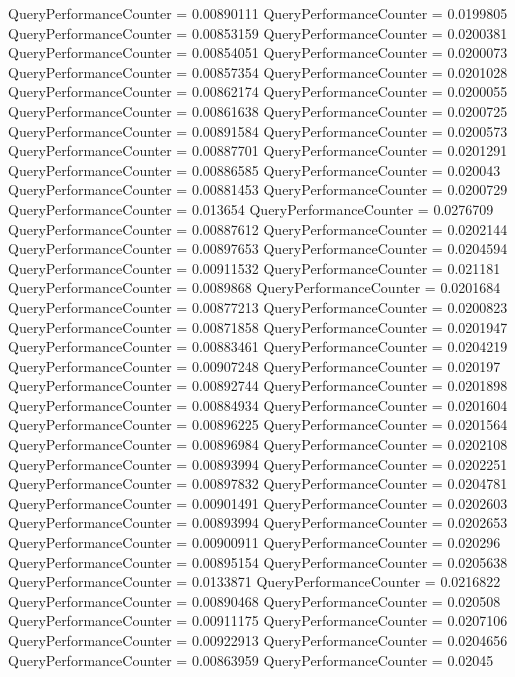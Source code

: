 \documentclass[9pt]{article}
\theoremstyle{plain}
\theoremstyle{definition}
\theoremstyle{remark}
\numberwithin{equation}{section}
\begin{document}
QueryPerformanceCounter  =  0.00890111
QueryPerformanceCounter  =  0.0199805
QueryPerformanceCounter  =  0.00853159
QueryPerformanceCounter  =  0.0200381
QueryPerformanceCounter  =  0.00854051
QueryPerformanceCounter  =  0.0200073
QueryPerformanceCounter  =  0.00857354
QueryPerformanceCounter  =  0.0201028
QueryPerformanceCounter  =  0.00862174
QueryPerformanceCounter  =  0.0200055
QueryPerformanceCounter  =  0.00861638
QueryPerformanceCounter  =  0.0200725
QueryPerformanceCounter  =  0.00891584
QueryPerformanceCounter  =  0.0200573
QueryPerformanceCounter  =  0.00887701
QueryPerformanceCounter  =  0.0201291
QueryPerformanceCounter  =  0.00886585
QueryPerformanceCounter  =  0.020043
QueryPerformanceCounter  =  0.00881453
QueryPerformanceCounter  =  0.0200729
QueryPerformanceCounter  =  0.013654
QueryPerformanceCounter  =  0.0276709
QueryPerformanceCounter  =  0.00887612
QueryPerformanceCounter  =  0.0202144
QueryPerformanceCounter  =  0.00897653
QueryPerformanceCounter  =  0.0204594
QueryPerformanceCounter  =  0.00911532
QueryPerformanceCounter  =  0.021181
QueryPerformanceCounter  =  0.0089868
QueryPerformanceCounter  =  0.0201684
QueryPerformanceCounter  =  0.00877213
QueryPerformanceCounter  =  0.0200823
QueryPerformanceCounter  =  0.00871858
QueryPerformanceCounter  =  0.0201947
QueryPerformanceCounter  =  0.00883461
QueryPerformanceCounter  =  0.0204219
QueryPerformanceCounter  =  0.00907248
QueryPerformanceCounter  =  0.020197
QueryPerformanceCounter  =  0.00892744
QueryPerformanceCounter  =  0.0201898
QueryPerformanceCounter  =  0.00884934
QueryPerformanceCounter  =  0.0201604
QueryPerformanceCounter  =  0.00896225
QueryPerformanceCounter  =  0.0201564
QueryPerformanceCounter  =  0.00896984
QueryPerformanceCounter  =  0.0202108
QueryPerformanceCounter  =  0.00893994
QueryPerformanceCounter  =  0.0202251
QueryPerformanceCounter  =  0.00897832
QueryPerformanceCounter  =  0.0204781
QueryPerformanceCounter  =  0.00901491
QueryPerformanceCounter  =  0.0202603
QueryPerformanceCounter  =  0.00893994
QueryPerformanceCounter  =  0.0202653
QueryPerformanceCounter  =  0.00900911
QueryPerformanceCounter  =  0.020296
QueryPerformanceCounter  =  0.00895154
QueryPerformanceCounter  =  0.0205638
QueryPerformanceCounter  =  0.0133871
QueryPerformanceCounter  =  0.0216822
QueryPerformanceCounter  =  0.00890468
QueryPerformanceCounter  =  0.020508
QueryPerformanceCounter  =  0.00911175
QueryPerformanceCounter  =  0.0207106
QueryPerformanceCounter  =  0.00922913
QueryPerformanceCounter  =  0.0204656
QueryPerformanceCounter  =  0.00863959
QueryPerformanceCounter  =  0.02045
\end{document}
